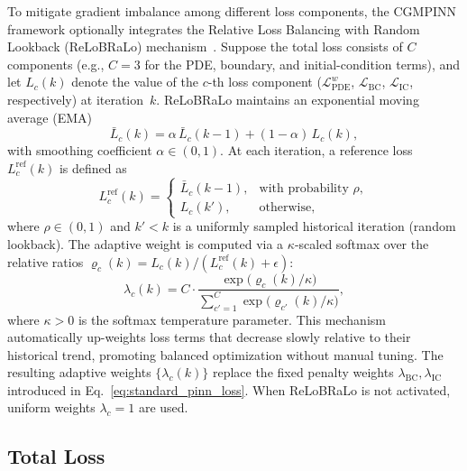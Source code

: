\documentclass{article}
\theoremstyle{plain}
\theoremstyle{definition}
\theoremstyle{remark}
\begin{document}
	To mitigate gradient imbalance among different loss components, the
	CGMPINN framework optionally integrates the Relative Loss Balancing
	with Random Lookback (ReLoBRaLo) mechanism~\cite{Xiang26}.
	Suppose the total loss consists of $C$ components
	(e.g., $C=3$ for the PDE, boundary, and initial-condition terms),
	and let $L_c(k)$ denote the value of the $c$-th loss component
	($\mathcal{L}_{\mathrm{PDE}}^{w}$, $\mathcal{L}_{\mathrm{BC}}$,
	$\mathcal{L}_{\mathrm{IC}}$, respectively) at iteration~$k$.
	ReLoBRaLo maintains an exponential moving average (EMA)
	\begin{equation}
		\bar{L}_c(k)
		= \alpha\,\bar{L}_c(k\!-\!1)+(1\!-\!\alpha)\,L_c(k),
		\label{eq:relobralo_ema}
	\end{equation}
	with smoothing coefficient $\alpha\in(0,1)$.
	At each iteration, a reference loss $L_c^{\mathrm{ref}}(k)$ is defined as
	\begin{equation}
		L_c^{\mathrm{ref}}(k)=
		\begin{cases}
			\bar{L}_c(k-1), & \text{with probability } \rho,\\
			L_c(k'), & \text{otherwise},
		\end{cases}
		\label{eq:relobralo_ref}
	\end{equation}
	where $\rho\in(0,1)$ and $k'< k$ is a uniformly sampled
	historical iteration (random lookback).
	The adaptive weight is computed via a $\kappa$-scaled softmax over the
	relative ratios
	$\varrho_c(k)=L_c(k)/(L_c^{\mathrm{ref}}(k)+\epsilon)$:
	\begin{equation}
		\lambda_c(k)
		= C\cdot
		\frac{\exp\!\bigl(\varrho_c(k)/\kappa\bigr)}
		{\sum_{c'=1}^{C}
			\exp\!\bigl(\varrho_{c'}(k)/\kappa\bigr)},
		\label{eq:relobralo_weight}
	\end{equation}
	where $\kappa>0$ is the softmax temperature parameter. This mechanism
	automatically up-weights loss terms that decrease slowly relative to
	their historical trend, promoting balanced optimization without manual
	tuning.
	The resulting adaptive weights $\{\lambda_c(k)\}$ replace the fixed
	penalty weights $\lambda_{\mathrm{BC}},\lambda_{\mathrm{IC}}$ introduced
	in Eq.~\eqref{eq:standard_pinn_loss}. When ReLoBRaLo is not activated,
	uniform weights $\lambda_c=1$ are used.
	
	\subsection{Total Loss}
	
\end{document}
